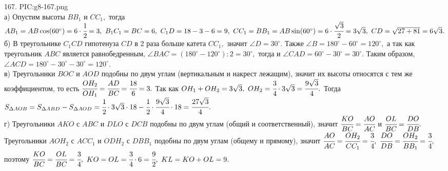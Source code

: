167. {{PIC:g8-167.png}}\\
а) Опустим высоты $BB_1$ и $CC_1,$ тогда $AB_1=AB\cos(60^\circ)=6\cdot\cfrac{1}{2}=3,\ B_1C_1=BC=6,\ C_1D=18-3-6=9,\ CC_1=BB_1=AB\sin(60^\circ)=6\cdot\cfrac{\sqrt{3}}{2}=3\sqrt{3},\ CD=\sqrt{27+81}=6\sqrt{3}.$\\
б) В треугольнике $C_1CD$ гипотенуза $CD$ в 2 раза больше катета $CC_1,$ значит $\angle D=30^\circ.$ Также $\angle B=180^\circ-60^\circ=120^\circ,$ а так как треугольник $ABC$ является равнобедренным, $\angle BAC=(180^\circ-120^\circ):2=30^\circ,$ тогда и $\angle CAD=60^\circ-30^\circ=30^\circ.$ Таким образом, $\angle ACD=180^\circ-30^\circ-30^\circ=120^\circ.$\\
в)  Треугольники $BOC$ и $AOD$ подобны по двум углам (вертикальным и накрест лежащим), значит их высоты относятся с тем же коэффициентом, то есть $\cfrac{OH_2}{OH_1}=\cfrac{AD}{BC}=\cfrac{18}{6}=3.$ Так как $OH_1+OH_2=3\sqrt{3},\ OH_2=\cfrac{3}{4}\cdot3\sqrt{3}=\cfrac{9\sqrt{3}}{4}.$ Тогда $S_{\Delta AOB}=S_{\Delta ABD}-S_{\Delta AOD}=\cfrac{1}{2}\cdot 3\sqrt{3}\cdot 18-\cfrac{1}{2}\cdot \cfrac{9\sqrt{3}}{4}\cdot 18=\cfrac{27\sqrt{3}}{4}.$\\
г) Треугольники $AKO$ с $ABC$ и $DLO$ с $DCB$ подобны по двум углам (общий и соответственный), значит $\cfrac{KO}{BC}=\cfrac{AO}{AC}$ и $\cfrac{OL}{BC}=\cfrac{DO}{DB}.$ Треугольники $AOH_2$ с $ACC_1$ и $ODH_2$ с $DBB_1$ подобны по двум углам (общему и прямому), значит $\cfrac{AO}{AC}=\cfrac{OH_2}{CC_1}=\cfrac{3}{4},\ \cfrac{DO}{DB}=\cfrac{OH_2}{BB_1}=\cfrac{3}{4},$ поэтому $\cfrac{KO}{BC}=\cfrac{OL}{BC}=\cfrac{3}{4},\
KO=OL=\cfrac{3}{4}\cdot6=\cfrac{9}{2},\ KL=KO+OL=9.$\newpage\noindent
